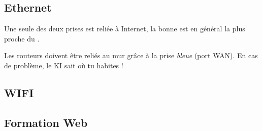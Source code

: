 \documentclass{ki019}
\begin{document}
\pagestyle{empty}


\subsection{Ethernet}

\Footer
\lipsum[1-2]

\begin{kiframe}
    Une seule des deux prises  est reliée à Internet, la bonne est en général la plus proche du .

    Les routeurs doivent être reliés au mur grâce à la prise \emph{bleue} (port WAN). En cas de problème, le KI sait où tu habites !
\end{kiframe}

\lipsum[1]

\subsection{WIFI}

\lipsum[1]


\subsection{Formation Web}

\Footer
\lipsum[1-3]
\end{document}
